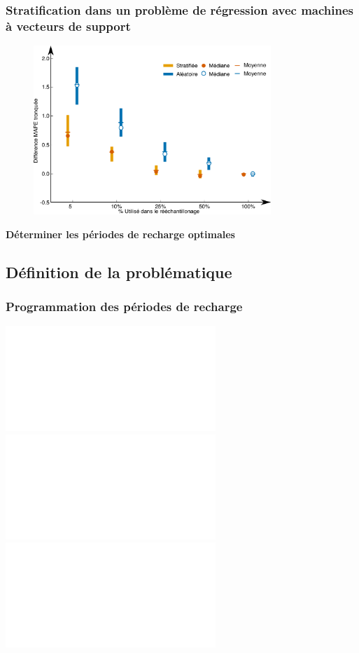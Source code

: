 \documentclass[french]{beamer}
\begin{document}
{\begin{frame}
\frametitle{Stratification dans un problème de régression avec machines à vecteurs de support} 
\begin{figure}
\begin{center}
\includegraphics[width=0.8\textwidth]{figDiff_SVR_Inp_state_year_2003.pdf}
\end{center}
\end{figure}
\end{frame}

{
\begin{frame}
\begin{center}
\huge \textbf{Déterminer les périodes de recharge optimales}
\end{center}
\end{frame}
}
\addtocounter{framenumber}{-1}


\subsection{Définition de la problématique}

\begin{frame}
\begin{center}
\frametitle{Programmation des périodes de recharge}
\includegraphics<1>[width=0.9\linewidth]{obj01.pdf}
\includegraphics<2>[width=0.9\linewidth]{obj02.pdf}
\includegraphics<3>[width=0.9\linewidth]{obj03.pdf}
\end{center}
\end{frame}
% 
% 

}
\end{document}
